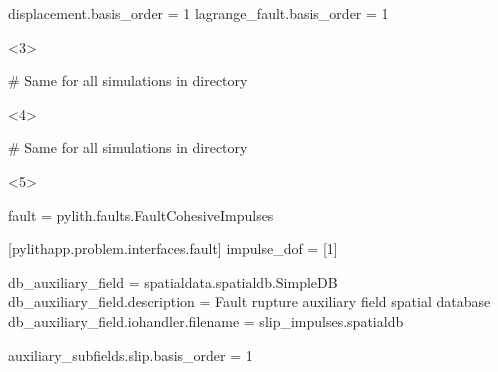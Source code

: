 \documentclass[aspectratio=169]{beamer}
\begin{document}
\begin{frame}[t,fragile]
\begin{minipage}[t]{0.60\textwidth}
\begin{onlyenv}
\begin{cfgcode}
        displacement.basis_order = 1
        lagrange_fault.basis_order = 1
      \end{cfgcode}
    \end{onlyenv}
    \begin{onlyenv}<3>
      \begin{cfgcode}
        # Same for all simulations in directory
      \end{cfgcode}
    \end{onlyenv}
    \begin{onlyenv}<4>
      \begin{cfgcode}
        # Same for all simulations in directory
      \end{cfgcode}
    \end{onlyenv}
    \begin{onlyenv}<5>
      \begin{cfgcode}
        fault = pylith.faults.FaultCohesiveImpulses

        [pylithapp.problem.interfaces.fault]
        impulse_dof = [1]

        db_auxiliary_field = spatialdata.spatialdb.SimpleDB
        db_auxiliary_field.description = Fault rupture auxiliary field spatial database
        db_auxiliary_field.iohandler.filename = slip_impulses.spatialdb

        auxiliary_subfields.slip.basis_order = 1
      \end{cfgcode}
    \end{onlyenv}
  \end{minipage}

  
\end{frame}
\end{document}
